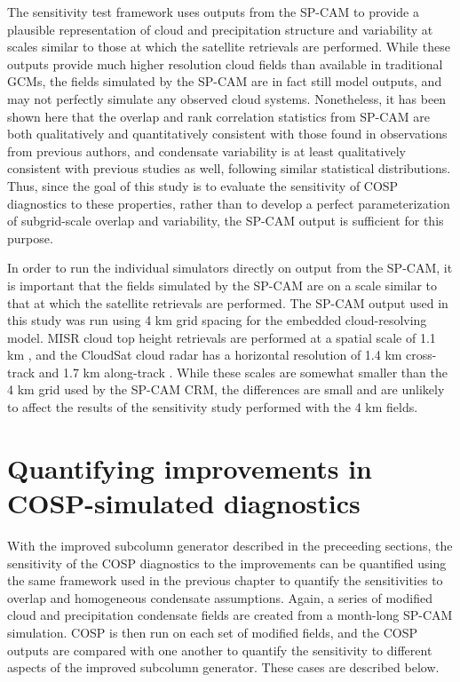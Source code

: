 The sensitivity test framework uses outputs from the SP-CAM to provide a plausible representation of cloud and precipitation structure and variability at scales similar to those at which the satellite retrievals are performed. While these outputs provide much higher resolution cloud fields than available in traditional GCMs, the fields simulated by the SP-CAM are in fact still model outputs, and may not perfectly simulate any observed cloud systems. Nonetheless, it has been shown here that the overlap and rank correlation statistics from SP-CAM are both qualitatively and quantitatively consistent with those found in observations from previous authors, and condensate variability is at least qualitatively consistent with previous studies as well, following similar statistical distributions. Thus, since the goal of this study is to evaluate the sensitivity of COSP diagnostics to these properties, rather than to develop a perfect parameterization of subgrid-scale overlap and variability, the SP-CAM output is sufficient for this purpose. %

In order to run the individual simulators directly on output from the SP-CAM, it is important that the fields simulated by the SP-CAM are on a scale similar to that at which the satellite retrievals are performed. The SP-CAM output used in this study was run using 4 km grid spacing for the embedded cloud-resolving model. MISR cloud top height retrievals are performed at a spatial scale of 1.1 km \citep{moroney_et_al_2002}, and the CloudSat cloud radar has a horizontal resolution of 1.4 km cross-track and 1.7 km along-track \citep{tanelli_et_al_2008}. While these scales are somewhat smaller than the 4 km grid used by the SP-CAM CRM, the differences are small and are unlikely to affect the results of the sensitivity study performed with the 4 km fields.

\section{Quantifying improvements in COSP-simulated diagnostics}
\label{subgrid2_results_section}
With the improved subcolumn generator described in the preceeding sections, the sensitivity of the COSP diagnostics to the improvements can be quantified using the same framework used in the previous chapter to quantify the sensitivities to overlap and homogeneous condensate assumptions. Again, a series of modified cloud and precipitation condensate fields are created from a month-long SP-CAM simulation. COSP is then run on each set of modified fields, and the COSP outputs are compared with one another to quantify the sensitivity to different aspects of the improved subcolumn generator. These cases are described below.

